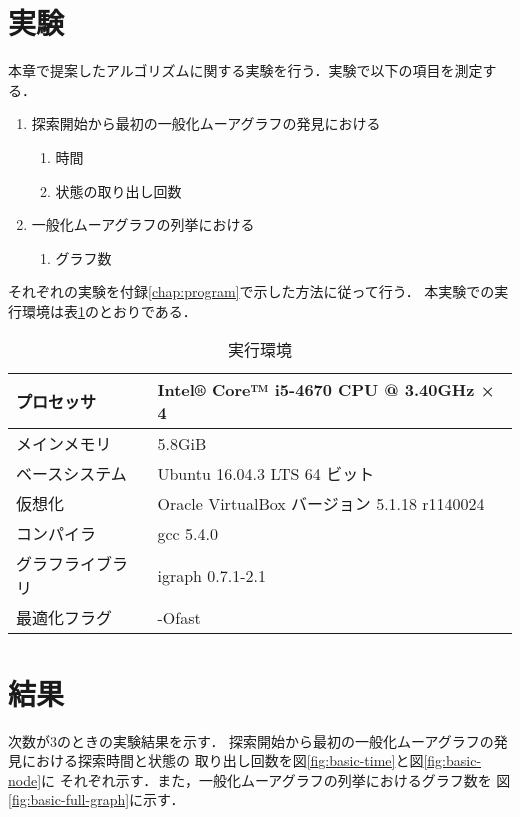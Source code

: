 \section{実験}
\label{sect:exp-basic-algorithm}
本章で提案したアルゴリズムに関する実験を行う．実験で以下の項目を測定する．
\begin{enumerate}
\item 探索開始から最初の一般化ムーアグラフの発見における
  \begin{enumerate}
  \item 時間
  \item 状態の取り出し回数
  \end{enumerate}
\item 一般化ムーアグラフの列挙における
  \begin{enumerate}
  \item グラフ数
  \end{enumerate}
\end{enumerate}
それぞれの実験を付録\ref{chap:program}で示した方法に従って行う．
本実験での実行環境は表\ref{tab:basic-algorithm-env}のとおりである．
\begin{table}
  \caption{実行環境}
  \label{tab:basic-algorithm-env}
  \centering
  \begin{tabular}{ll}
    \hline
    プロセッサ & Intel® Core™ i5-4670 CPU @ 3.40GHz × 4 \\ \hline
    メインメモリ & 5.8GiB \\ \hline
    ベースシステム & Ubuntu 16.04.3 LTS 64 ビット \\ \hline
    仮想化 & Oracle VirtualBox バージョン 5.1.18 r1140024 \\ \hline
    コンパイラ & gcc 5.4.0 \\ \hline
    グラフライブラリ & igraph 0.7.1-2.1 \\ \hline
    最適化フラグ & -Ofast \\ \hline
  \end{tabular}
\end{table}

\section{結果}
\label{sect:result-basic-algorithm}
次数が3のときの実験結果を示す．
探索開始から最初の一般化ムーアグラフの発見における探索時間と状態の
取り出し回数を図\ref{fig:basic-time}と図\ref{fig:basic-node}に
それぞれ示す．また，一般化ムーアグラフの列挙におけるグラフ数を
図\ref{fig:basic-full-graph}に示す．

